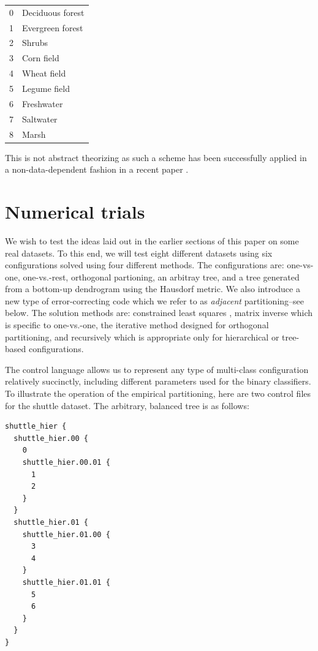 \begin{tabular}{ll}
	0 & Deciduous forest \\
	1 & Evergreen forest \\
	2 & Shrubs \\
	3 & Corn field \\
	4 & Wheat field \\
	5 & Legume field \\
	6 & Freshwater \\
	7 & Saltwater \\
	8 & Marsh
\end{tabular}

This is not abstract theorizing as
such a scheme has been successfully applied in a non-data-dependent fashion
in a recent paper \citep{Zhou_etal2019}.

\section{Numerical trials}

We wish to test the ideas laid out in the earlier sections of this paper 
on some real datasets.
To this end, we will test eight different datasets using six configurations 
solved using four different methods.
The configurations are: one-vs-one, one-vs.-rest, orthogonal partioning,
an arbitray tree, and a tree generated
from a bottom-up dendrogram using the Hausdorf metric.
We also introduce a new type of error-correcting code which we refer to as
{\it adjacent} partitioning--see below.
The solution methods are: constrained least squares \citep{Lawson_Hanson1995},
matrix inverse which is specific to one-vs.-one,
the iterative method designed for orthogonal partitioning,
and recursively which is appropriate
only for hierarchical or tree-based configurations.

The control language allows us to represent any type of multi-class 
configuration relatively succinctly, including different parameters
used for the binary classifiers.
To illustrate the operation of the empirical partitioning, here are
two control files for the shuttle dataset.
The arbitrary, balanced tree is as follows:
\begin{verbatim}
shuttle_hier {
  shuttle_hier.00 {
    0
    shuttle_hier.00.01 {
      1
      2
    }
  }
  shuttle_hier.01 {
    shuttle_hier.01.00 {
      3
      4
    }
    shuttle_hier.01.01 {
      5
      6
    }
  }
}

\end{verbatim}

